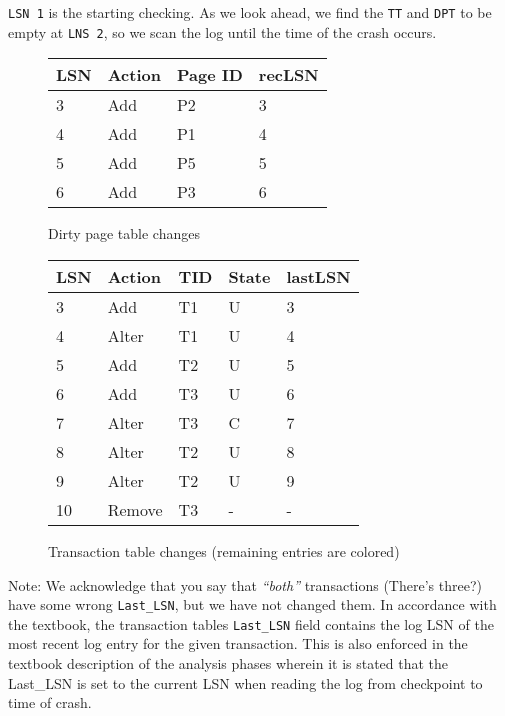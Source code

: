 \begin{multicols}{2}

{\tt LSN 1} is the starting checking. As we look ahead, we find the {\tt TT} and
{\tt DPT} to be empty at {\tt LNS 2}, so we scan the log until the time of the
crash occurs.

\begin{figure}[H]
    \centering
    \begin{tabular}{|l|l|l|l|}
        \hline
        {\bf LSN} & {\bf Action} & {\bf Page ID} & {\bf recLSN} \\ \hline
        3 & Add     & P2 & 3  \\ \hline
        4 & Add     & P1 & 4  \\ \hline
        5 & Add     & P5 & 5  \\ \hline
        6 & Add     & P3 & 6  \\ \hline
    \end{tabular}
    \caption{Dirty page table changes}
    \label{fig:dpt}
\end{figure}

\colbreak

\begin{figure}[H]
    \centering
    \begin{tabular}{|l|l|l|l|l|}
        \hline
        {\bf LSN} & {\bf Action}   & {\bf TID}  & {\bf State}  & {\bf lastLSN} \\ \hline
        3  & Add     & T1 & U & 3 \\ \hline %
        \rowcolor{awesomecolor}
        4  & Alter   & T1 & U & 4 \\ \hline %
        5  & Add     & T2 & U & 5 \\ \hline
        6  & Add     & T3 & U & 6 \\ \hline
        7  & Alter   & T3 & C & 7 \\ \hline
        8  & Alter   & T2 & U & 8 \\ \hline
        \rowcolor{awesomecolor}
        9  & Alter   & T2 & U & 9 \\ \hline
        10 & Remove  & T3 & - & - \\ \hline
    \end{tabular}
    \caption{Transaction table changes (remaining entries are colored)}
    \label{fig:tt}
\end{figure}

\end{multicols}

Note: We acknowledge that you say that {\it ``both''} transactions (There's three?) have some wrong {\tt Last\_LSN}, but we have not changed them. In accordance with the textbook, the transaction tables {\tt Last\_LSN} field contains the log LSN of the most recent log entry for the given transaction. This is also enforced in the textbook description of the analysis phases wherein it is stated that the {Last\_LSN} is set to the current LSN when reading the log from checkpoint to time of crash.\\

